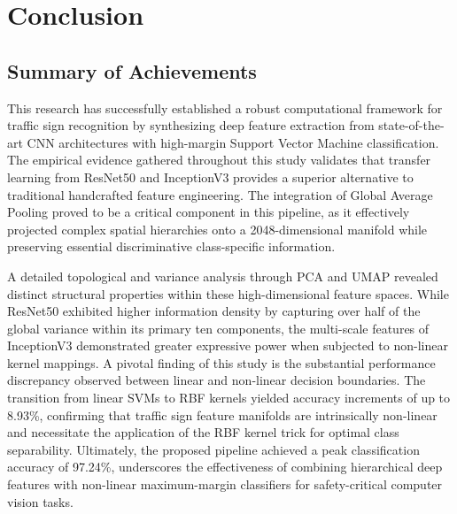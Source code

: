 \chapter{Conclusion}

\section{Summary of Achievements}
This research has successfully established a robust computational framework for traffic sign recognition by synthesizing deep feature extraction from state-of-the-art CNN architectures with high-margin Support Vector Machine classification. The empirical evidence gathered throughout this study validates that transfer learning from ResNet50 and InceptionV3 provides a superior alternative to traditional handcrafted feature engineering. The integration of Global Average Pooling proved to be a critical component in this pipeline, as it effectively projected complex spatial hierarchies onto a 2048-dimensional manifold while preserving essential discriminative class-specific information.

A detailed topological and variance analysis through PCA and UMAP revealed distinct structural properties within these high-dimensional feature spaces. While ResNet50 exhibited higher information density by capturing over half of the global variance within its primary ten components, the multi-scale features of InceptionV3 demonstrated greater expressive power when subjected to non-linear kernel mappings. A pivotal finding of this study is the substantial performance discrepancy observed between linear and non-linear decision boundaries. The transition from linear SVMs to RBF kernels yielded accuracy increments of up to 8.93\%, confirming that traffic sign feature manifolds are intrinsically non-linear and necessitate the application of the RBF kernel trick for optimal class separability. Ultimately, the proposed pipeline achieved a peak classification accuracy of 97.24\%, underscores the effectiveness of combining hierarchical deep features with non-linear maximum-margin classifiers for safety-critical computer vision tasks.

